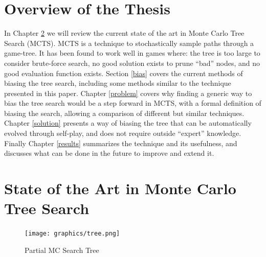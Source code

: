 \documentclass[11pt]{report}
\begin{document}
\section{Overview of the Thesis}
In Chapter \ref{mcts} we will review the current state of the art in Monte Carlo Tree Search (MCTS). MCTS is a technique to stochastically sample paths through a game-tree. It has been found to work well in games where: the tree is too large to consider brute-force search, no good solution exists to prune ``bad'' nodes, and no good evaluation function exists. Section \ref{bias} covers the current methods of biasing the tree search, including some methods similar to the technique presented in this paper. Chapter \ref{problem} covers why finding a generic way to bias the tree search would be a step forward in MCTS, with a formal definition of biasing the search, allowing a comparison of different but similar techniques. Chapter \ref{solution} presents a way of biasing the tree that can be automatically evolved through self-play, and does not require outside ``expert'' knowledge. Finally Chapter \ref{results} summarizes the technique and its usefulness, and discusses what can be done in the future to improve and extend it.

\section{State of the Art in Monte Carlo Tree Search}\label{mcts}

\begin{figure}
	\begin{center}
	\begin{HexBoard}[board size=5]
	\end{HexBoard}
	\texttt{[image: graphics/tree.png]}
	\end{center}
	\caption{Partial MC Search Tree}
	\label{fig:tree}
\end{figure}
\end{document}
